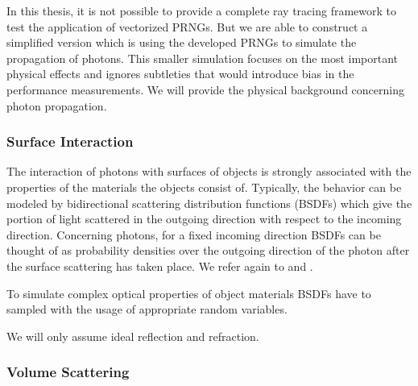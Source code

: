 \documentclass{stdlocal}
\begin{document}
    In this thesis, it is not possible to provide a complete ray tracing framework to test the application of vectorized PRNGs.
    But we are able to construct a simplified version which is using the developed PRNGs to simulate the propagation of photons.
    This smaller simulation focuses on the most important physical effects and ignores subtleties that would introduce bias in the performance measurements.
    We will provide the physical background concerning photon propagation.

    \begin{definition}

    \end{definition}

    \begin{definition}[Photon]

    \end{definition}

    \subsubsection*{Surface Interaction} %
    \label{ssub:surface_interaction}
      The interaction of photons with surfaces of objects is strongly associated with the properties of the materials the objects consist of.
      Typically, the behavior can be modeled by bidirectional scattering distribution functions (BSDFs) which give the portion of light scattered in the outgoing direction with respect to the incoming direction.
      Concerning photons, for a fixed incoming direction BSDFs can be thought of as probability densities over the outgoing direction of the photon after the surface scattering has taken place.
      We refer again to \textcite{pharr2016} and \textcite{pawellek2017}.

      To simulate complex optical properties of object materials BSDFs have to sampled with the usage of appropriate random variables.

      We will only assume ideal reflection and refraction.

      \begin{definition}

      \end{definition}

    \subsubsection*{Volume Scattering} %
    \label{ssub:volume_scattering}
      \begin{definition}

      \end{definition}

      \begin{lemma}

      \end{lemma}
\end{document}

